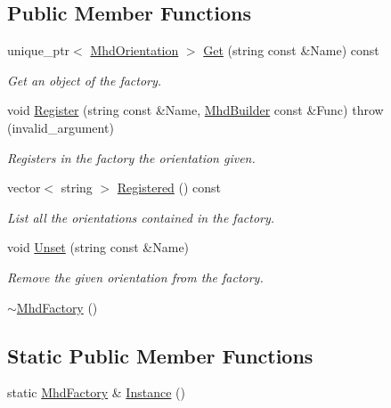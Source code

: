\subsection*{\-Public \-Member \-Functions}
\begin{DoxyCompactItemize}
\item 
unique\-\_\-ptr$<$ \hyperlink{classMhd_1_1MhdOrientation}{\-Mhd\-Orientation} $>$ \hyperlink{classMhd_1_1MhdFactory_a41095d4c88c3cd2a3bf8c24081b485b8}{\-Get} (string const \&\-Name) const 
\begin{DoxyCompactList}\small\item\em \-Get an object of the factory. \end{DoxyCompactList}\item 
void \hyperlink{classMhd_1_1MhdFactory_ae24c471f86ce728f63b9d639a5c57284}{\-Register} (string const \&\-Name, \hyperlink{namespaceMhd_a9b520e48eb7e726a85e6224875935aff}{\-Mhd\-Builder} const \&\-Func)  throw (invalid\-\_\-argument)
\begin{DoxyCompactList}\small\item\em \-Registers in the factory the orientation given. \end{DoxyCompactList}\item 
vector$<$ string $>$ \hyperlink{classMhd_1_1MhdFactory_a2e0a9c9984f7fea4251656bb3e401100}{\-Registered} () const 
\begin{DoxyCompactList}\small\item\em \-List all the orientations contained in the factory. \end{DoxyCompactList}\item 
void \hyperlink{classMhd_1_1MhdFactory_ab0a2f768224b9a72680b62540fde82c2}{\-Unset} (string const \&\-Name)
\begin{DoxyCompactList}\small\item\em \-Remove the given orientation from the factory. \end{DoxyCompactList}\item 
\hyperlink{classMhd_1_1MhdFactory_a80a3c72319b23cf062311e477720b04a}{$\sim$\-Mhd\-Factory} ()
\end{DoxyCompactItemize}
\subsection*{\-Static \-Public \-Member \-Functions}
\begin{DoxyCompactItemize}
\item 
static \hyperlink{classMhd_1_1MhdFactory}{\-Mhd\-Factory} \& \hyperlink{classMhd_1_1MhdFactory_a94346aec0e8f822e3f7934389f3ab28c}{\-Instance} ()
\end{DoxyCompactItemize}


